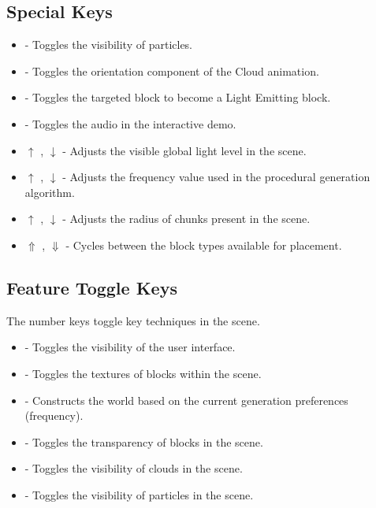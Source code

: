 \documentclass[a4paper,11pt,titlepage]{scrartcl}
\begin{document}
\subsection{Special Keys}
\begin{itemize}
	\item {} - Toggles the visibility of particles.
	\item {} - Toggles the orientation component of the Cloud animation.
	\item {} - Toggles the targeted block to become a Light Emitting block.
	\item {} - Toggles the audio in the interactive demo.
	\item $\uparrow$ , $\downarrow$  - Adjusts the visible global light level in the scene.
	\item $\uparrow$ , $\downarrow$  - Adjusts the frequency value used in the procedural generation algorithm.
	\item $\uparrow$ , $\downarrow$  - Adjusts the radius of chunks present in the scene.
	\item $\Uparrow$ , $\Downarrow$  - Cycles between the block types available for placement.
\end{itemize}
      
\subsection{Feature Toggle Keys}
The number keys toggle key techniques in the scene.
\begin{itemize}
	\item {} - Toggles the visibility of the user interface.
	\item {} - Toggles the textures of blocks within the scene.
	\item {} - Constructs the world based on the current generation preferences (frequency).
	\item {} - Toggles the transparency of blocks in the scene.
	\item {} - Toggles the visibility of clouds in the scene.
	\item {} - Toggles the visibility of particles in the scene.
\end{itemize}

\end{document}
